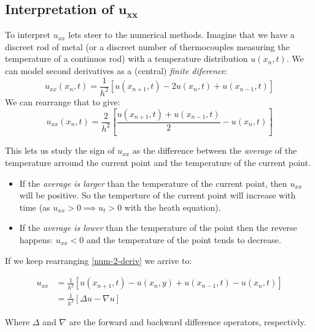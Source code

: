 \documentclass[../pde.tex]{subfiles}
\begin{document}
    \subsection{\sffamily Interpretation of $\mathbf{u_{xx}}$}
    To interpret $u_{xx}$ lets steer to the numerical methods. Imagine that we have a discreet rod of metal (or a discreet number
    of thermocouples measuring the temperature of a continuos rod) with a temperature distribution $u(x_n,t)$. We can model second
    derivatives as a  (central) \emph{finite diference}:
    \begin{equation}\label{num-2-deriv}
        u_{xx}(x_n,t) = \frac{1}{h^2}[u(x_{n+1},t) - 2u(x_n,t) + u(x_{n-1},t)]
    \end{equation}
    We can rearrange that to give:
    \begin{equation*}        u_{xx}(x_n,t) = \frac{2}{h^2}\left[\frac{u(x_{n+1},t)+u(x_{n-1},t)}{2}-u(x_n,t)\right]
    \end{equation*}
    
    This lets us study the sign of $u_{xx}$ as the difference between the \emph{average} of the temperature arround the current point
    and the temperature of the current point.
    \begin{itemize}
        \item If the \emph{average is larger} than the temperature of the current point, then $u_{xx}$ will be positive. 
            So the temperture of the current point will increase with
            time (as $u_{xx} > 0 \implies u _{t}>0$ with the heath equation).
        \item If the \emph{average is lower} than the temperature of the point then the reverse happens: $u_{xx} < 0 $ and the 
            temperature of the point tends to decrease.
    \end{itemize}

    If we keep rearranging \eqref{num-2-deriv} we arrive to:

    \begin{align*}
        u_{xx} &= \frac{1}{h^2} \left[ u(x_{n+1},t) - u(x_{n},y) + u(x_{n-1},t) - u(x_{n},t)  \right] \\
               &= \frac{1}{h^2} \left[ \Delta u - \nabla u \right] 
    \end{align*}
        
    Where $\Delta$ and $\nabla$ are the forward and backward difference operators, respectivly.
\end{document}
